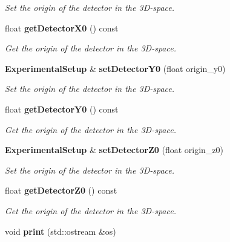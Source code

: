 \begin{DoxyCompactItemize}
\begin{DoxyCompactList}\small\item\em Set the origin of the detector in the 3\-D-\/space. \end{DoxyCompactList}\item 
float {\bf get\-Detector\-X0} () const \label{classCALICE_1_1ExperimentalSetup_a7f4e4616fa5a304aea5ad88e79522871}

\begin{DoxyCompactList}\small\item\em Get the origin of the detector in the 3\-D-\/space. \end{DoxyCompactList}\item 
{\bf Experimental\-Setup} \& {\bf set\-Detector\-Y0} (float origin\-\_\-y0)\label{classCALICE_1_1ExperimentalSetup_aa8f94b2b4eaac33011c13df005e4141d}

\begin{DoxyCompactList}\small\item\em Set the origin of the detector in the 3\-D-\/space. \end{DoxyCompactList}\item 
float {\bf get\-Detector\-Y0} () const \label{classCALICE_1_1ExperimentalSetup_a70298a2312261febaaee1440369b8667}

\begin{DoxyCompactList}\small\item\em Get the origin of the detector in the 3\-D-\/space. \end{DoxyCompactList}\item 
{\bf Experimental\-Setup} \& {\bf set\-Detector\-Z0} (float origin\-\_\-z0)\label{classCALICE_1_1ExperimentalSetup_a20c69d5737d7afa4d3ca5ba61f80a324}

\begin{DoxyCompactList}\small\item\em Set the origin of the detector in the 3\-D-\/space. \end{DoxyCompactList}\item 
float {\bf get\-Detector\-Z0} () const \label{classCALICE_1_1ExperimentalSetup_ac90c01cf3383bfc43094309d5bb7a677}

\begin{DoxyCompactList}\small\item\em Get the origin of the detector in the 3\-D-\/space. \end{DoxyCompactList}\item 
void {\bf print} (std\-::ostream \&os)\label{classCALICE_1_1ExperimentalSetup_a526e124a082191bf6a06d1ddc6a1ea38}


\end{DoxyCompactItemize}
